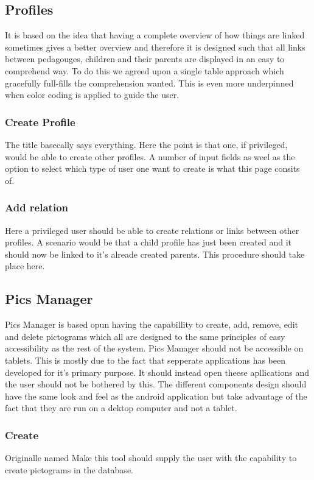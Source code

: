 \subsection{Profiles}
It is based on the idea that having a complete overview of how things are linked sometimes gives a better overview and therefore it is designed such that all links between pedagouges, children and their parents are displayed in an easy to comprehend way. To do this we agreed upon a single table approach which gracefully full-fills the comprehension wanted. This is even more underpinned when color coding is applied to guide the user.
\subsubsection*{Create Profile}
The title basecally says everything. Here the point is that one, if privileged, would be able to create other profiles. A number of input fields as weel as the option to select which type of user one want to create is what this page consits of.
\subsubsection*{Add relation}
Here a privileged user should be able to create relations or links between other profiles. A scenario would be that a child profile has just been created and it should now be linked to it's alreade created parents. This procedure should take place here.

\subsection{Pics Manager}
Pics Manager is based opun having the capabillity to create, add, remove, edit and delete pictograms which all are designed to the same principles of easy accessibility as the rest of the system. Pics Manager should not be accessible on tablets. This is mostly due to the fact that sepperate applications has been developed for it's primary purpose. It should instead open theese apllications and the user should not be bothered by this. The different components design should have the same look and feel as the android application but take advantage of the fact that they are run on a dektop computer and not a tablet.
\subsubsection*{Create}
Originalle named Make this tool should supply the user with the capability to create pictograms in the database.
